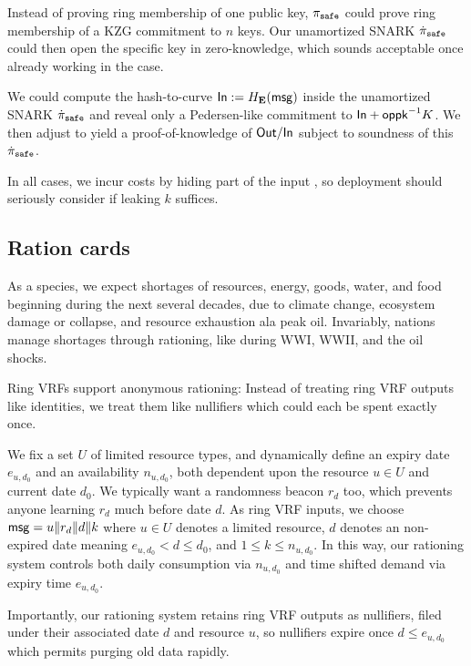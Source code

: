 Instead of proving ring membership of one public key,
$\pi_{\mathtt{safe}}$ could prove ring membership of a KZG commitment to $n$ keys.
Our unamortized SNARK $\dot{\pi}_{\mathtt{safe}}$ could then open the specific key in
zero-knowledge, which sounds acceptable once already working in the \pisafe case.

We could compute the hash-to-curve ${\mathsf{In}} := H_{{\mathbf{E}}}(\mathsf{msg})$ inside the
unamortized SNARK $\dot{\pi}_{\mathtt{safe}}$ and reveal only a Pedersen-like commitment
to ${\mathsf{In}} + \mathsf{oppk}^{-1} K$.  We then adjust \PedVRF to yield
a proof-of-knowledge of ${\mathsf{Out}}/{\mathsf{In}}$ subject to soundness of this
$\dot{\pi}_{\mathtt{safe}}$.

In all cases, we incur costs by hiding part of the input \msg, so
deployment should seriously consider if leaking $k$ suffices.


\subsection{Ration cards}

As a species, we expect shortages of resources, energy, goods, water,
and food beginning during the next several decades, due to climate change,
ecosystem damage or collapse, and resource exhaustion ala peak oil. 
Invariably, nations manage shortages through rationing, like during
WWI, WWII, and the oil shocks.  

Ring VRFs support anonymous rationing:
Instead of treating ring VRF outputs like identities,
we treat them like nullifiers which could each be spent exactly once.

\def\expiry{e}
We fix a set $U$ of limited resource types, and dynamically define
an expiry date $\expiry_{u,d_0}$ and an availability $n_{u,d_0}$, 
both dependent upon the resource $u \in U$ and current date $d_0$.
We typically want a randomness beacon $r_d$ too, which prevents
anyone learning $r_d$ much before date $d$. 
As ring VRF inputs, we choose
 $\mathsf{msg} = u \| r_d \| d \| k$
where $u \in U$ denotes a limited resource,
 $d$ denotes an non-expired date meaning $\expiry_{u,d_0} < d \le d_0$,
 and $1 \le k \le n_{u,d_0}$.
In this way, our rationing system controls both daily consumption
via $n_{u,d_0}$ and time shifted demand via expiry time $\expiry_{u,d_0}$.

Importantly, our rationing system retains ring VRF outputs as nullifiers,
filed under their associated date $d$ and resource $u$, so nullifiers
expire once $d \le \expiry_{u,d_0}$ which permits purging old data rapidly.

